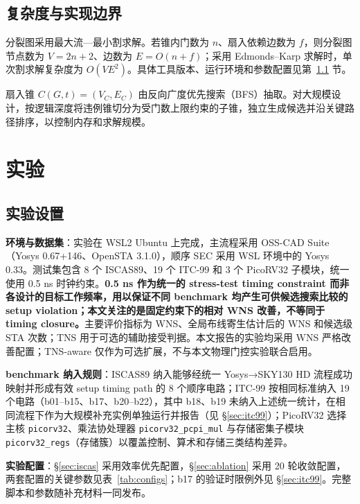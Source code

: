 \documentclass[twocolumn,10pt,fontset=windows]{ctexart}
\begin{document}
\FloatBarrier
\subsection{复杂度与实现边界}\label{sec:impl}

分裂图采用最大流—最小割求解。若锥内门数为 $n$、扇入依赖边数为 $f$，则分裂图节点数为 $V=2n+2$、边数为 $E=O(n+f)$；采用 Edmonds--Karp 求解时，单次割求解复杂度为 $O(VE^2)$。具体工具版本、运行环境和参数配置见第~\ref{sec:setup} 节。

扇入锥 $C(G, t) = (V_C, E_C)$ 由反向广度优先搜索（BFS）抽取。对大规模设计，按逻辑深度将违例锥切分为受门数上限约束的子锥，独立生成候选并沿关键路径排序，以控制内存和求解规模。

\FloatBarrier
\FloatBarrier
\section{实验}\label{sec:exp}

\subsection{实验设置}\label{sec:setup}

\textbf{环境与数据集}：实验在 WSL2 Ubuntu 上完成，主流程采用 OSS-CAD Suite（Yosys 0.67+146、OpenSTA 3.1.0），顺序 SEC 采用 WSL 环境中的 Yosys 0.33。测试集包含 8 个 ISCAS89、19 个 ITC-99 和 3 个 PicoRV32 子模块，统一使用 0.5 ns 时钟约束。\textbf{0.5 ns 作为统一的 stress-test timing constraint 而非各设计的目标工作频率，用以保证不同 benchmark 均产生可供候选搜索比较的 setup violation；本文关注的是固定约束下的相对 WNS 改善，不等同于 timing closure。}主要评价指标为 WNS、全局布线寄生估计后的 WNS 和候选级 STA 次数；TNS 用于可选的辅助接受判据。本文报告的实验均采用 WNS 严格改善配置；TNS-aware 仅作为可选扩展，不与本文物理门控实验联合启用。

\textbf{benchmark 纳入规则}：ISCAS89 纳入能够经统一 Yosys→SKY130 HD 流程成功映射并形成有效 setup timing path 的 8 个顺序电路；ITC-99 按相同标准纳入 19 个电路（b01--b15、b17、b20--b22），其中 b18、b19 未纳入上述统一统计，在相同流程下作为大规模补充实例单独运行并报告（见 \S\ref{sec:itc99}）；PicoRV32 选择主核 \texttt{picorv32}、乘法协处理器 \texttt{picorv32\_pcpi\_mul} 与存储密集子模块 \texttt{picorv32\_regs}（存储簇）以覆盖控制、算术和存储三类结构差异。

\textbf{实验配置}：\S\ref{sec:iscas} 采用效率优先配置，\S\ref{sec:ablation} 采用 20 轮收敛配置，两套配置的关键参数见表~\ref{tab:configs}；b17 的验证时限例外见 \S\ref{sec:itc99}。完整脚本和参数随补充材料一同发布。
\end{document}
